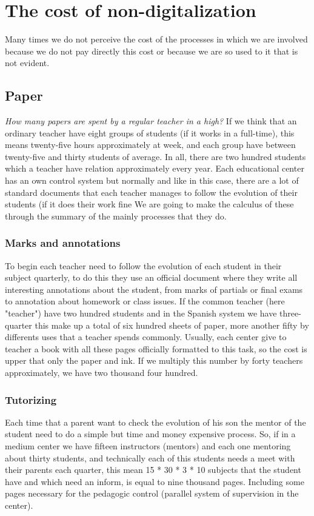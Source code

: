 \section{The cost of non-digitalization}

Many times we do not perceive the cost of the processes in which we are involved
because we do not pay directly this cost or because we are so used to it that is
not evident.

\subsection{Paper}
\textit{How many papers are spent by a regular teacher in a high?}
\intro
If we think that an ordinary teacher have eight groups of students (if it works in a
full-time), this means twenty-five hours approximately at week, and each group have
between twenty-five and thirty students of average. In all, there are two hundred students which a teacher have
relation approximately every year.
\intro
Each educational center has an own control system but normally and like in this case,
there are a lot of standard documents that each teacher manages to follow
the evolution of their students (if it does their work fine
\intro
We are going to make the calculus of these through the summary of the mainly
processes that they do.

\subsubsection{Marks and annotations}

To begin each teacher need to follow the evolution of each student in their
subject quarterly, to do this they use an official document where they write
all interesting annotations about the student, from marks of partials or final
exams to annotation about homework or class issues.
\intro
If the common teacher (here "teacher") have two hundred students and in the Spanish
system we have three-quarter this make up a total of six hundred sheets of paper,
more another fifty by differents uses that a teacher spends commonly.
Usually, each center give to teacher a book with all these pages officially
formatted to this task, so the cost is upper that only the paper and ink.
If we multiply this number by forty teachers approximately, we have
two thousand four hundred.

\subsubsection{Tutorizing}
Each time that a parent want to check the evolution of his son the mentor
of the student need to do a simple but time and money expensive process.
\intro
So, if in a medium center we have fifteen instructors (mentors) and each one mentoring about
thirty students, and technically each of this students needs a meet with their
parents each quarter, this mean 15 * 30 * 3 * 10 subjects that the student have
 and which need an inform, is equal to nine thousand pages.
Including some pages necessary for the pedagogic control (parallel system of
supervision in the center).

